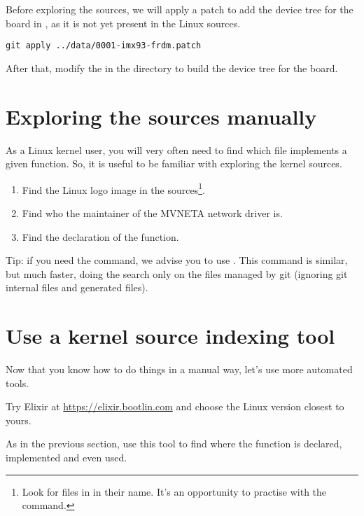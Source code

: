 \if{}
Before exploring the sources, we will apply a patch to add the device
tree for the  board in , as it is not yet present in the Linux sources.
\begin{verbatim}
git apply ../data/0001-imx93-frdm.patch
\end{verbatim}
After that, modify the  in the  directory to build the device tree for the  board.
\fi

\section{Exploring the sources manually}

As a Linux kernel user, you will very often need to find which file
implements a given function. So, it is useful to be familiar with
exploring the kernel sources.

\begin{enumerate}
\item Find the Linux logo image in the sources\footnote{Look for
      files in  in their name. It's an
      opportunity to practise with the  command.}.
\item Find who the maintainer of the MVNETA network driver is.
\item Find the declaration of the  function.
\end{enumerate}

Tip: if you need the  command, we advise you to use . This command is similar, but much faster, doing the search only
on the files managed by git (ignoring git internal files and generated
files).

\section{Use a kernel source indexing tool}

Now that you know how to do things in a manual way, let's use more
automated tools.

Try Elixir at \url{https://elixir.bootlin.com}
and choose the Linux version closest to yours.

As in the previous section, use this tool to find where
the  function is declared, implemented and
even used.
